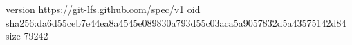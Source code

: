 version https://git-lfs.github.com/spec/v1
oid sha256:da6d55ceb7e44ea8a4545e089830a793d55c03aca5a9057832d5a43575142d84
size 79242
